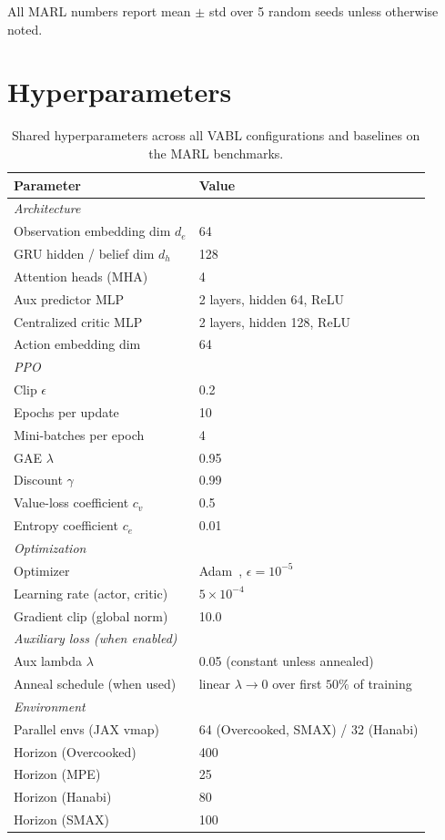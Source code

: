 \documentclass{article}
\theoremstyle{plain}
\theoremstyle{definition}
\theoremstyle{remark}
\begin{document}
All MARL numbers report mean $\pm$ std over 5 random seeds unless
otherwise noted.


\section{Hyperparameters}
\label{app:hyperparams}

\begin{table}[H]
\centering
\small
\begin{tabular}{ll}
\toprule
Parameter & Value \\
\midrule
\multicolumn{2}{l}{\textit{Architecture}} \\
Observation embedding dim $d_e$ & 64 \\
GRU hidden / belief dim $d_h$ & 128 \\
Attention heads (MHA) & 4 \\
Aux predictor MLP & 2 layers, hidden 64, ReLU \\
Centralized critic MLP & 2 layers, hidden 128, ReLU \\
Action embedding dim & 64 \\
\midrule
\multicolumn{2}{l}{\textit{PPO~\cite{schulman2017ppo}}} \\
Clip $\epsilon$ & 0.2 \\
Epochs per update & 10 \\
Mini-batches per epoch & 4 \\
GAE $\lambda$~\cite{schulman2016gae} & 0.95 \\
Discount $\gamma$ & 0.99 \\
Value-loss coefficient $c_v$ & 0.5 \\
Entropy coefficient $c_e$ & 0.01 \\
\midrule
\multicolumn{2}{l}{\textit{Optimization}} \\
Optimizer & Adam~\cite{kingma2015adam}, $\epsilon = 10^{-5}$ \\
Learning rate (actor, critic) & $5 \times 10^{-4}$ \\
Gradient clip (global norm) & 10.0 \\
\midrule
\multicolumn{2}{l}{\textit{Auxiliary loss (when enabled)}} \\
Aux lambda $\lambda$ & 0.05 (constant unless annealed) \\
Anneal schedule (when used) & linear $\lambda \to 0$ over first $50\%$ of training \\
\midrule
\multicolumn{2}{l}{\textit{Environment}} \\
Parallel envs (JAX vmap) & 64 (Overcooked, SMAX) / 32 (Hanabi) \\
Horizon (Overcooked) & 400 \\
Horizon (MPE) & 25 \\
Horizon (Hanabi) & 80 \\
Horizon (SMAX) & 100 \\
\bottomrule
\end{tabular}
\caption{Shared hyperparameters across all VABL configurations and baselines on the MARL benchmarks.}
\end{table}
\end{document}
